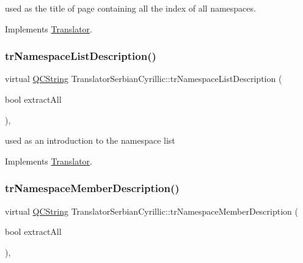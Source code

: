 used as the title of page containing all the index of all namespaces. 

Implements \mbox{\hyperlink{class_translator}{Translator}}.

\mbox{\label{class_translator_serbian_cyrillic_a572d5bad2f4a6a6fb957a32564df04b3}} 
\subsubsection{\texorpdfstring{trNamespaceListDescription()}{trNamespaceListDescription()}}
{\footnotesize\ttfamily virtual \mbox{\hyperlink{class_q_c_string}{Q\+C\+String}} Translator\+Serbian\+Cyrillic\+::tr\+Namespace\+List\+Description (\begin{DoxyParamCaption}\item[{bool}]{extract\+All }\end{DoxyParamCaption})\hspace{0.3cm}{\ttfamily [inline]}, {\ttfamily [virtual]}}

used as an introduction to the namespace list 

Implements \mbox{\hyperlink{class_translator}{Translator}}.

\mbox{\label{class_translator_serbian_cyrillic_ae8413d6ec3c8802e09cd14bf254a2f3a}} 
\subsubsection{\texorpdfstring{trNamespaceMemberDescription()}{trNamespaceMemberDescription()}}
{\footnotesize\ttfamily virtual \mbox{\hyperlink{class_q_c_string}{Q\+C\+String}} Translator\+Serbian\+Cyrillic\+::tr\+Namespace\+Member\+Description (\begin{DoxyParamCaption}\item[{bool}]{extract\+All }\end{DoxyParamCaption})\hspace{0.3cm}{\ttfamily [inline]}, {\ttfamily [virtual]}}

